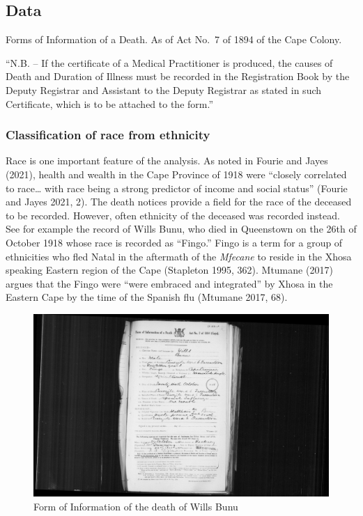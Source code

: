 \documentclass[fleqn,10pt,lineno]{wlpeerj} %
\begin{document}
\hypertarget{data}{%
\subsection{Data}\label{data}}

Forms of Information of a Death. As of Act No.~7 of 1894 of the Cape Colony.

``N.B. -- If the certificate of a Medical Practitioner is produced, the causes of Death and Duration of Illness must be recorded in the Registration Book by the Deputy Registrar and Assistant to the Deputy Registrar as stated in such Certificate, which is to be attached to the form.''

\hypertarget{classification-of-race-from-ethnicity}{%
\subsubsection{Classification of race from ethnicity}\label{classification-of-race-from-ethnicity}}

Race is one important feature of the analysis. As noted in Fourie and Jayes (2021), health and wealth in the Cape Province of 1918 were ``closely correlated to race\ldots{} with race being a strong predictor of income and social status'' (Fourie and Jayes 2021, 2). The death notices provide a field for the race of the deceased to be recorded. However, often ethnicity of the deceased was recorded instead. See for example the record of Wills Bunu, who died in Queenstown on the 26th of October 1918 whose race is recorded as ``Fingo.'' Fingo is a term for a group of ethnicities who fled Natal in the aftermath of the \emph{Mfecane} to reside in the Xhosa speaking Eastern region of the Cape (Stapleton 1995, 362). Mtumane (2017) argues that the Fingo were ``were embraced and integrated'' by Xhosa in the Eastern Cape by the time of the Spanish flu (Mtumane 2017, 68).

\begin{figure}
\centering
\includegraphics{images/wills_bunu.jpg}
\caption{Form of Information of the death of Wills Bunu}
\end{figure}
\end{document}

